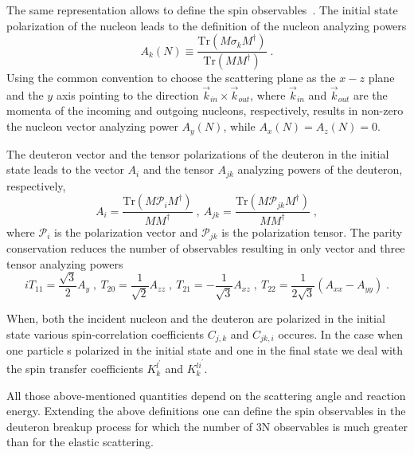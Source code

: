 The same representation allows to define the spin observables~\cite{Glockle1996}. The initial state polarization of the nucleon leads to the definition of the nucleon analyzing powers
\begin{equation}
A_{k}(N) \equiv \frac{\mathrm{Tr}(M\sigma_{k}M^{\dagger})}{\mathrm{Tr}(MM^{\dagger})}\;.
\end{equation}
Using the common convention to choose the scattering plane as the $x-z$ plane and the $y$ axis pointing to the direction $\vec{k}_{in}\times\vec{k}_{out}$, where $\vec{k}_{in}$ and $\vec{k}_{out}$ are the momenta of the incoming and outgoing nucleons, respectively, results in non-zero the nucleon vector analyzing power $A_{y}(N)$, while $A_{x}(N) = A_{z}(N) = 0$.

The deuteron vector and the tensor polarizations of the deuteron in the initial state leads to the vector $A_{i}$ and the tensor $A_{jk}$ analyzing powers of the deuteron, respectively,
\begin{equation}
A_{i} = \frac{\mathrm{Tr}(M\mathcal{P}_{i}M^{\dagger})}{MM^{\dagger}}\;,~A_{jk} = \frac{\mathrm{Tr}(M\mathcal{P}_{jk}M^{\dagger})}{MM^{\dagger}}\;,
\end{equation}
where $\mathcal{P}_{i}$ is the polarization vector and $\mathcal{P}_{jk}$ is the polarization tensor. The parity conservation reduces the number of observables resulting in only vector and three tensor analyzing powers
\begin{equation}
iT_{11} = \frac{\sqrt{3}}{2}A_{y}\;,~T_{20} = \frac{1}{\sqrt{2}}A_{zz}\;,~T_{21} = -\frac{1}{\sqrt{3}}A_{xz}\;,~T_{22} = \frac{1}{2\sqrt{3}}(A_{xx} - A_{yy})\;.
\end{equation}

When, both the incident nucleon and the deuteron are polarized in the initial state various spin-correlation coefficients $C_{j,k}$ and $C_{jk, i}$ occures. In the case when one particle s polarized in the initial state and one in the final state we deal with the spin transfer coefficients $K^{l^{\prime}}_{k}$ and $K^{li^{\prime}}_{k}$. 

All those above-mentioned quantities depend on the scattering angle and reaction energy.
Extending the above definitions one can define the spin observables in the deuteron breakup process for which the number of 3N observables is much greater than for the elastic scattering.

